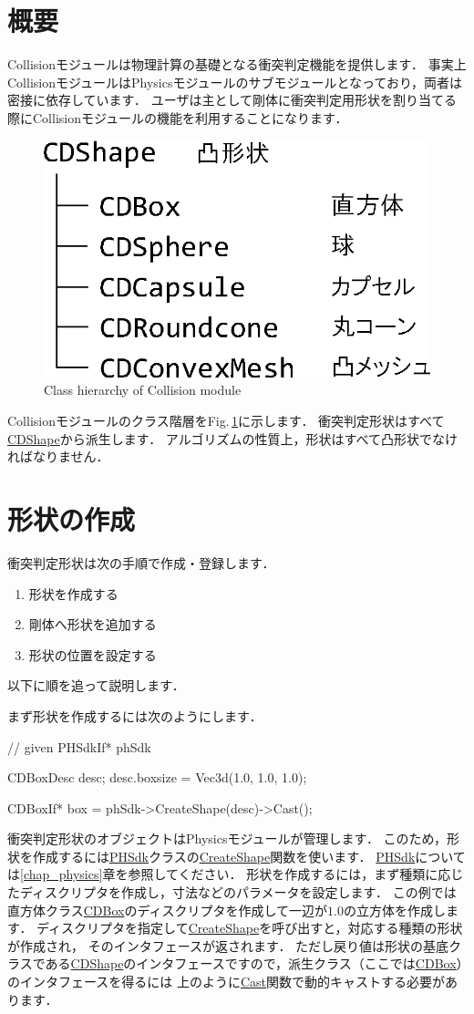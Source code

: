 \section{概要}

Collisionモジュールは物理計算の基礎となる衝突判定機能を提供します．
\KLUDGE 事実上CollisionモジュールはPhysicsモジュールのサブモジュールとなっており，両者は密接に依存しています．
\KLUDGE ユーザは主として剛体に衝突判定用形状を割り当てる際にCollisionモジュールの機能を利用することになります．

\begin{figure}[t]
\begin{center}
\includegraphics[width=.4\hsize]{fig/cdclass.eps}
\end{center}
\caption{Class hierarchy of Collision module}
\label{fig_cdclass}
\end{figure}

Collisionモジュールのクラス階層をFig.\,\ref{fig_cdclass}に示します．
\KLUDGE 衝突判定形状はすべて\url{CDShape}から派生します．
\KLUDGE アルゴリズムの性質上，形状はすべて凸形状でなければなりません．

\section{形状の作成}

\KLUDGE 衝突判定形状は次の手順で作成・登録します．
\begin{enumerate}
\item 形状を作成する
\item 剛体へ形状を追加する
\item 形状の位置を設定する
\end{enumerate}
\KLUDGE 以下に順を追って説明します．

\KLUDGE まず形状を作成するには次のようにします．
\begin{sourcecode}
// given PHSdkIf* phSdk

CDBoxDesc desc;
desc.boxsize = Vec3d(1.0, 1.0, 1.0);

CDBoxIf* box = phSdk->CreateShape(desc)->Cast();
\end{sourcecode}
\KLUDGE 衝突判定形状のオブジェクトはPhysicsモジュールが管理します．
\KLUDGE このため，形状を作成するには\url{PHSdk}クラスの\url{CreateShape}関数を使います．
\url{PHSdk}については\ref{chap_physics}章を参照してください．
\KLUDGE 形状を作成するには，まず種類に応じたディスクリプタを作成し，寸法などのパラメータを設定します．
\KLUDGE この例では直方体クラス\url{CDBox}のディスクリプタを作成して一辺が$1.0$の立方体を作成します．
\KLUDGE ディスクリプタを指定して\url{CreateShape}を呼び出すと，対応する種類の形状が作成され，
\KLUDGE そのインタフェースが返されます．
\KLUDGE ただし戻り値は形状の基底クラスである\url{CDShape}のインタフェースですので，派生クラス（ここでは\url{CDBox}）のインタフェースを得るには
\KLUDGE 上のように\url{Cast}関数で動的キャストする必要があります．

